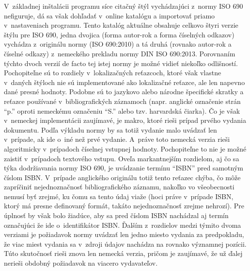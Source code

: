 \documentclass{fithesis3}
\begin{document}
	V~základnej inštalácii programu síce citačný štýl vychádzajúci z~normy ISO 690 nefiguruje, dá sa však dohľadať v~online katalógu a importovať priamo v~nastaveniach programu. Tento katalóg aktuálne obsahuje celkovo štyri verzie štýlu pre ISO 690, jedna dvojica (forma autor-rok a forma číselných odkazov) vychádza z~originálu normy (ISO 690:2010) a tá druhá (rovnako autor-rok a číselné odkazy) z~nemeckého prekladu normy DIN ISO 690:2013. Porovnaním týchto dvoch verzií de facto tej istej normy je možné vidieť niekoľko odlišností. Pochopiteľne sú to rozdiely v~lokalizačných reťazcoch, ktoré však vlastne v~daných štýloch nie sú implementované ako lokalizačné reťazce, ale len napevno dané presné hodnoty. Podobne sú to jazykovo alebo národne špecifické skratky a reťazce používané v~bibliografických záznamoch (napr. anglické označenie strán “p.” oproti nemeckému označeniu “S.” alebo tzv. harvardská čiarka).
	Čo je však v~nemeckej implementácii zaujímavé, je makro, ktoré rieši prípad prvého vydania dokumentu. Podľa výkladu normy by sa totiž vydanie malo uvádzať len v~prípade, ak ide o~iné než prvé vydanie. A~práve toto nemecká verzia rieši algoritmicky v~prípadoch číselnej vstupnej hodnoty. Pochopiteľne to nie je možné zaistiť v~prípadoch textového vstupu.
	Oveľa markantnejším rozdielom, aj čo sa týka dodržiavania normy ISO 690, je uvádzanie termínu “ISBN” pred samotným číslom ISBN. V~prípade anglického originálu totiž tento reťazec chýba, čo môže zapríčiniť nejednoznačnosť bibliografického záznamu, nakoľko vo všeobecnosti nemusí byť zrejmé, ku čomu sa tento údaj viaže (hoci práve v~prípade ISBN, ktorý má presne definovaný formát, takáto nejednoznačnosť zrejme nehrozí). Pre úplnosť by však bolo žiadúce, aby sa pred číslom ISBN nachádzal aj termín označujúci že ide o~identifikátor ISBN.
	Ďalším z~rozdielov medzi týmito dvoma verziami je požiadavok normy uvádzať len jedno miesto vydania za predpokladu, že viac miest vydania sa v~zdroji údajov nachádza na rovnako významnej pozícii. Túto skutočnosť rieši znova len nemecká verzia, pričom je zaujímavé, že už ďalej nerieši obdobný požiadavok na viacero vydavateľov.
\end{document}
